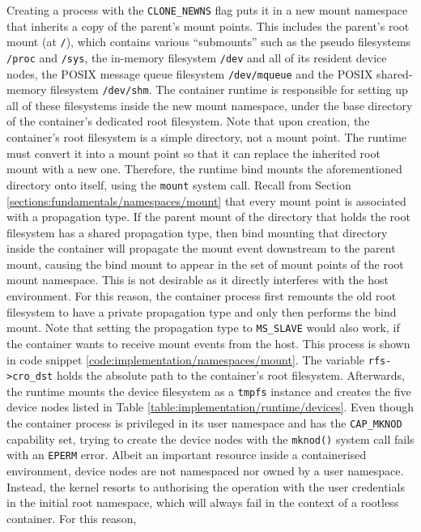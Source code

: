 Creating a process with the \verb|CLONE_NEWNS| flag puts it in a new mount namespace that 
inherits a copy of the parent's mount points. This includes the parent's root mount (at \verb|/|),
which contains various \enquote{submounts} such as the pseudo filesystems \verb|/proc| and \verb|/sys|,
the in-memory filesystem \verb|/dev| and all of its resident device nodes,
the POSIX message queue filesystem \verb|/dev/mqueue| and the POSIX shared-memory filesystem \verb|/dev/shm|.
The container runtime is responsible for setting up all of these filesystems inside the new mount namespace,
under the base directory of the container's dedicated root filesystem. Note that upon creation, the container's root filesystem is a simple directory, not a mount point. 
The runtime must convert it into a mount point so that it can replace the inherited root mount 
with a new one. Therefore, the runtime bind mounts the aforementioned directory onto itself, using 
the \verb|mount| system call. Recall from Section \ref{sections:fundamentals/namespaces/mount} 
that every mount point is associated with a propagation type. If the parent mount of the 
directory that holds the root filesystem has a shared propagation type, then bind mounting 
that directory inside the container will propagate the mount event downstream to the parent mount, 
causing the bind mount to appear in the set of mount points of the root mount namespace.
This is not desirable as it directly interferes with the host environment. For this reason, 
the container process first remounts the old root filesystem to have a private propagation type and 
only then performs the bind mount.
Note that setting the propagation type to \verb|MS_SLAVE| would also work, if the container 
wants to receive mount events from the host. This process is shown in code snippet \ref{code:implementation/namespaces/mount}.
The variable \verb|rfs->cro_dst| holds the absolute path to the container's root filesystem.
Afterwards, the runtime mounts the device filesystem as a \verb|tmpfs| instance and creates the
five device nodes listed in Table \ref{table:implementation/runtime/devices}.
Even though the container process is privileged in its user namespace and has the \verb|CAP_MKNOD|
capability set, trying to create the device nodes with the \verb|mknod()| system call fails with an
\verb|EPERM| error. Albeit an important resource inside a containerised environment, device nodes 
are not namespaced nor owned by a user namespace. 
Instead, the kernel resorts to authorising the operation with the user credentials in the initial 
root namespace, which will always fail in the context of a rootless container. For this reason,
